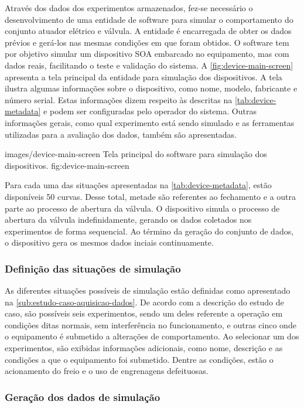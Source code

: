 Através dos dados dos experimentos armazenados, fez-se necessário o desenvolvimento de uma entidade
de software para simular o comportamento do conjunto atuador elétrico e válvula. A entidade é
encarregada de obter os dados prévios e gerá-los nas mesmas condições em que foram obtidos. O
software tem por objetivo simular um dispositivo \gls{SOA} embarcado no equipamento, mas com dados
reais, facilitando o teste e validação do sistema. A \cref{fig:device-main-screen} apresenta a tela
principal da entidade para simulação dos dispositivos. A tela ilustra algumas informações sobre o
dispositivo, como nome, modelo, fabricante e número serial. Estas informações dizem respeito às
descritas na \cref{tab:device-metadata} e podem ser configuradas pelo operador do sistema. Outras
informações gerais, como qual experimento está sendo simulado e as ferramentas utilizadas para a
avaliação dos dados, também são apresentadas.

  {images/device-main-screen}
  {Tela principal do software para simulação dos dispositivos.}
  {fig:device-main-screen}

Para cada uma das situações apresentadas na \cref{tab:device-metadata}, estão disponíveis \num{50}
curvas. Desse total, metade são referentes ao fechamento e a outra parte ao processo de abertura da
válvula. O dispositivo simula o processo de abertura da válvula indefinidamente, gerando os dados
coletados nos experimentos de forma sequencial. Ao término da geração do conjunto de dados, o
dispositivo gera os mesmos dados inciais continuamente.


\subsubsection{Definição das situações de simulação}

As diferentes situações possíveis de simulação estão definidas como apresentado na
\cref{sub:estudo-caso-aquisicao-dados}. De acordo com a descrição do estudo de caso, são possíveis
seis experimentos, sendo um deles referente a operação em condições ditas normais, sem interferência
no funcionamento, e outras cinco onde o equipamento é submetido a alterações de comportamento. Ao
selecionar um dos experimentos, são exibidas informações adicionais, como nome, descrição e as
condições a que o equipamento foi submetido. Dentre as condições, estão o acionamento do freio e o
uso de engrenagens defeituosas.


\subsubsection{Geração dos dados de simulação}

